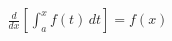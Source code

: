 \documentclass[preview]{standalone}
\begin{document}
\begin{align*}
\frac{d}{dx} \left[ \int_{a}^{x} f(t) \, dt \right] = f(x)
\end{align*}
\end{document}
